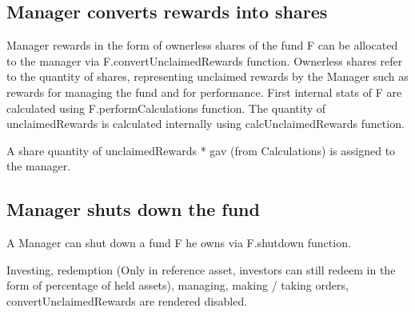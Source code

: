 \documentclass[conference]{IEEEtran}
\begin{document}
\subsection{Manager converts rewards into shares}

Manager rewards in the form of ownerless shares of the fund F can be allocated to the manager via F.convertUnclaimedRewards function. Ownerless shares refer to the quantity of shares, representing unclaimed rewards by the Manager such as rewards for managing the fund and for performance. First internal stats of F are calculated using F.performCalculations function. The quantity of unclaimedRewards is calculated internally using calcUnclaimedRewards function.

A share quantity of unclaimedRewards * gav (from Calculations) is assigned to the manager.

\subsection{Manager shuts down the fund}

A Manager can shut down a fund F he owns via F.shutdown function.

Investing, redemption (Only in reference asset, investors can still redeem in the form of percentage of held assets), managing, making / taking orders, convertUnclaimedRewards are rendered disabled.
%
%

\end{document}
